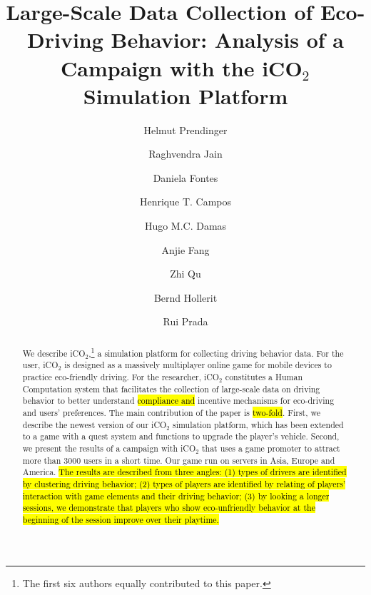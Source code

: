 \documentclass[preprint,authoryear,12pt]{elsarticle}
\date{}
\begin{document}
\begin{frontmatter}
\title{Large-Scale Data Collection of Eco-Driving Behavior:
Analysis of a Campaign with the iCO$_2$ Simulation Platform}

\author[label1]{Helmut Prendinger}
\author[label1]{Raghvendra Jain}
\author[label2]{Daniela Fontes}
\author[label2]{Henrique T. Campos}
\author[label2]{Hugo M.C. Damas}
\author[label1]{Anjie Fang}
\author[label1]{Zhi Qu}
\author[label1]{Bernd Hollerit}
\author[label2]{Rui Prada}



\address[label1]{{helmut@nii.ac.jp, jain@nii.ac.jp, fanganjie@gmail.com, hollerit@gmail.com, zq12721@my.bristol.ac.uk}\\
	National Institute of Informatics, \\
    2-1-2 Hitotsubashi, Chiyoda-ku, Tokyo, 101-8430, Japan\\}

\address[label2]{{danielafilipa@gmail.com,henriquetcampos@gmail.com,hugo.damas@gmail.com,rui.prada@tecnico.ulisboa.pt}\\
    INESC-ID and Instituto Superior T\'{e}cnico, Universidade de Lisboa,\\
    Av. Prof. Cavaco Silva, Taguspark Porto Salvo, Portugal\\}


\begin{abstract}
We describe iCO$_2$,\footnote{The first six authors equally contributed to this paper.} a simulation platform for collecting driving behavior data. For the user, iCO$_2$ is designed as a massively multiplayer online game for mobile devices to practice eco-friendly driving. For the researcher, iCO$_2$ constitutes a Human Computation system that facilitates the collection of large-scale data on driving behavior to better understand \hl{compliance and} incentive mechanisms for eco-driving and users' preferences. The main contribution of the paper is \hl{two-fold}. First, we describe the newest version of our iCO$_2$ simulation platform, which has been extended to a game with a quest system and functions to upgrade the player's vehicle. Second, we present the results of a campaign with iCO$_2$ that uses a game promoter to attract more than 3000 users in a short time. Our game run on servers in Asia, Europe and America.
\hl{The results are described from three angles: (1) types of drivers are identified by clustering driving behavior; (2) types of players are identified by relating of players' interaction with game elements and their driving behavior; (3) by looking a longer sessions, we demonstrate that players who show eco-unfriendly behavior at the beginning of the session improve over their playtime.}
\end{abstract}


\end{frontmatter}
\end{document}
